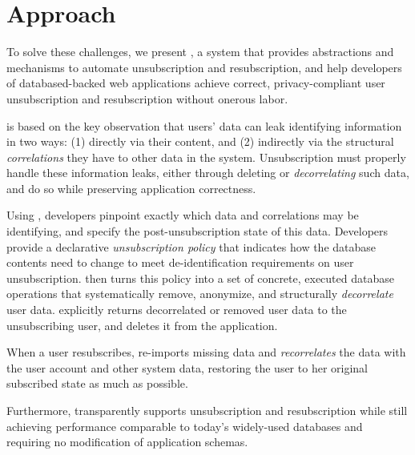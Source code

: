 \section{Approach}
To solve these challenges, we present \sys, a system that provides
abstractions and mechanisms to automate unsubscription and resubscription, and 
help developers of databased-backed web applications achieve correct, privacy-compliant user
unsubscription and resubscription without onerous labor.

\sys is based on the key observation that users' data can leak identifying information in two ways:
(1) directly via their content, and (2) indirectly via the structural \emph{correlations} they have
to other data in the system. 
Unsubscription must properly handle these information leaks, either through deleting or
\emph{decorrelating} such data, and do so while preserving
application correctness.

%
Using \sys, developers pinpoint exactly which data and correlations may be identifying, and
specify the post-unsubscription state of this data. Developers provide a declarative
\emph{unsubscription policy} that indicates how the database contents need to change to meet
de-identification requirements on user unsubscription.
%
\sys then turns this policy into a set of concrete, executed database operations that systematically
remove, anonymize, and structurally \emph{decorrelate} user data. \sys explicitly returns
decorrelated or removed user data to the unsubscribing user, and deletes it from the application.
%

%
When a user resubscribes, \sys re-imports missing data and \emph{recorrelates} the data with the
user account and other system data, restoring the user to her original subscribed state as much as
possible.

Furthermore, \sys transparently supports unsubscription and resubscription while still achieving performance
comparable to today’s widely-used databases and requiring no modification of application schemas.
